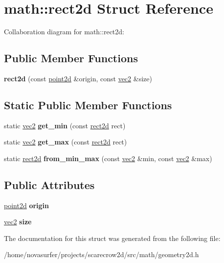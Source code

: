 \hypertarget{structmath_1_1rect2d}{}\section{math\+:\+:rect2d Struct Reference}
\label{structmath_1_1rect2d}


Collaboration diagram for math\+:\+:rect2d\+:
\subsection*{Public Member Functions}
\begin{DoxyCompactItemize}
\item 
\mbox{\label{structmath_1_1rect2d_a44078d7fa94e50da83cd4e5602e34d16}} 
{\bfseries rect2d} (const \hyperlink{structmath_1_1vec2}{point2d} \&origin, const \hyperlink{structmath_1_1vec2}{vec2} \&size)
\end{DoxyCompactItemize}
\subsection*{Static Public Member Functions}
\begin{DoxyCompactItemize}
\item 
\mbox{\label{structmath_1_1rect2d_a4a596ea9c6a9400d8bd9bff22a300967}} 
static \hyperlink{structmath_1_1vec2}{vec2} {\bfseries get\+\_\+min} (const \hyperlink{structmath_1_1rect2d}{rect2d} rect)
\item 
\mbox{\label{structmath_1_1rect2d_a3a3179b3b551720e5d87b6a160be1407}} 
static \hyperlink{structmath_1_1vec2}{vec2} {\bfseries get\+\_\+max} (const \hyperlink{structmath_1_1rect2d}{rect2d} rect)
\item 
\mbox{\label{structmath_1_1rect2d_aaf11cea257a3ed2a89b82f368cec9550}} 
static \hyperlink{structmath_1_1rect2d}{rect2d} {\bfseries from\+\_\+min\+\_\+max} (const \hyperlink{structmath_1_1vec2}{vec2} \&min, const \hyperlink{structmath_1_1vec2}{vec2} \&max)
\end{DoxyCompactItemize}
\subsection*{Public Attributes}
\begin{DoxyCompactItemize}
\item 
\mbox{\label{structmath_1_1rect2d_a73a4f01bf1cf7c9e52f1eaddc3fd0f97}} 
\hyperlink{structmath_1_1vec2}{point2d} {\bfseries origin}
\item 
\mbox{\label{structmath_1_1rect2d_a2df7e605efb547ebeb47ae70876a7bbb}} 
\hyperlink{structmath_1_1vec2}{vec2} {\bfseries size}
\end{DoxyCompactItemize}


The documentation for this struct was generated from the following file\+:\begin{DoxyCompactItemize}
\item 
/home/novasurfer/projects/scarecrow2d/src/math/geometry2d.\+h\end{DoxyCompactItemize}
